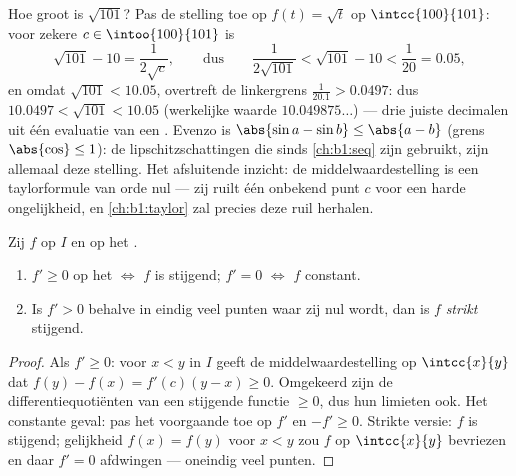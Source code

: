 \begin{example}\label{ex:b1:derivative:mvtestimate}
Hoe groot is $\sqrt{101}$? Pas de stelling toe op $f(t) = \sqrt
t$ op $\intcc{100}{101}$: voor zekere $c \in \intoo{100}{101}$ is
\[
\sqrt{101} - 10 = \frac{1}{2\sqrt c},
\qquad\text{dus}\qquad
\frac{1}{2\sqrt{101}} < \sqrt{101} - 10 < \frac{1}{20} = 0.05 ,
\]
en omdat $\sqrt{101} < 10.05$, overtreft de linkergrens
$\frac{1}{20.1} > 0.0497$: dus $10.0497 < \sqrt{101} < 10.05$
(werkelijke waarde $10.049875\dots$) --- drie juiste decimalen
uit één evaluatie van een . Evenzo is $\abs{\sin a -
\sin b} \leq \abs{a - b}$ (grens $\abs{\cos}\leq 1$): de
lipschitzschattingen die sinds \cref{ch:b1:seq} zijn gebruikt,
zijn allemaal deze stelling. Het afsluitende inzicht: de
middelwaardestelling is een taylorformule van orde nul --- zij
ruilt één onbekend punt $c$ voor een harde ongelijkheid, en
\cref{ch:b1:taylor} zal precies deze ruil herhalen.
\end{example}

\begin{corollary}[Monotoniecriterium]\label{cor:b1:derivative:monotone}
Zij $f$  op $I$ en  op het .
\begin{enumerate}
  \item $f' \geq 0$ op het  $\iff$ $f$ is stijgend; $f' = 0$
        $\iff$ $f$ constant.
  \item Is $f' > 0$ behalve in eindig veel punten waar zij nul wordt,
        dan is $f$ \emph{strikt} stijgend.
\end{enumerate}
\end{corollary}

\begin{proof}
Als $f' \geq 0$: voor $x < y$ in $I$ geeft de middelwaardestelling op
$\intcc{x}{y}$ dat $f(y) - f(x) = f'(c)(y - x) \geq 0$. Omgekeerd
zijn de differentiequotiënten van een stijgende functie $\geq 0$, dus
hun limieten ook. Het constante geval: pas het voorgaande toe op $f'$
en $-f' \geq 0$. Strikte versie: $f$ is stijgend; gelijkheid $f(x) =
f(y)$ voor $x < y$ zou $f$ op $\intcc{x}{y}$ bevriezen en daar $f' =
0$ afdwingen --- oneindig veel punten.
\end{proof}

